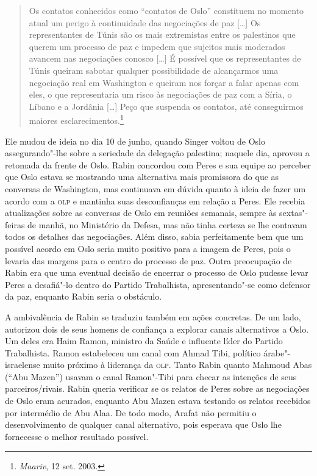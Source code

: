 \begin{quote}
Os contatos conhecidos como ``contatos de Oslo'' constituem no momento
atual um perigo à continuidade das negociações de paz {[}\ldots{}{]} Os
representantes de Túnis são os mais extremistas entre os palestinos que
querem um processo de paz e impedem que sujeitos mais moderados avancem
nas negociações conosco {[}\ldots{}{]} É possível que os representantes de Túnis
queiram sabotar qualquer possibilidade de alcançarmos uma negociação
real em Washington e queiram nos forçar a falar apenas com eles, o que
representaria um risco às negociações de paz com a Síria, o Líbano e a
Jordânia {[}\ldots{}{]} Peço que suspenda os contatos, até conseguirmos maiores
esclarecimentos.\footnote{\emph{Maariv}, 12 set. 2003.}
\end{quote}

Ele mudou de ideia no dia 10 de junho, quando Singer voltou de Oslo
assegurando"-lhe sobre a seriedade da delegação palestina; naquele dia,
aprovou a retomada da frente de Oslo. Rabin concordou com Peres e sua
equipe ao perceber que Oslo estava se mostrando uma alternativa mais
promissora do que as conversas de Washington, mas continuava em dúvida
quanto à ideia de fazer um acordo com a \textsc{olp} e mantinha suas
desconfianças em relação a Peres. Ele recebia atualizações sobre as
conversas de Oslo em reuniões semanais, sempre às sextas"-feiras de
manhã, no Ministério da Defesa, mas não tinha certeza se lhe contavam
todos os detalhes das negociações. Além disso, sabia perfeitamente bem
que um possível acordo em Oslo seria muito positivo para a imagem de
Peres, pois o levaria das margens para o centro do processo de paz.
Outra preocupação de Rabin era que uma eventual decisão de encerrar o
processo de Oslo pudesse levar Peres a desafiá"-lo dentro do Partido
Trabalhista, apresentando"-se como defensor da paz, enquanto Rabin seria
o obstáculo.

A ambivalência de Rabin se traduziu também em ações concretas. De um
lado, autorizou dois de seus homens de confiança a explorar canais
alternativos a Oslo. Um deles era Haim Ramon, ministro da Saúde e
influente líder do Partido Trabalhista. Ramon estabeleceu um canal com
Ahmad Tibi, político árabe"-israelense muito próximo à liderança da \textsc{olp}.
Tanto Rabin quanto Mahmoud Abas (``Abu Mazen'') usavam o canal Ramon"-Tibi
para checar as intenções de seus parceiros/rivais. Rabin queria
verificar se os relatos de Peres sobre as negociações de Oslo eram
acurados, enquanto Abu Mazen estava testando os relatos recebidos por
intermédio de Abu Alaa. De todo modo, Arafat não permitiu o
desenvolvimento de qualquer canal alternativo, pois esperava que Oslo
lhe fornecesse o melhor resultado possível.

